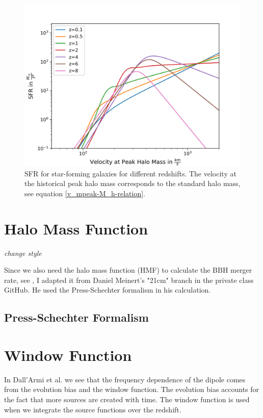 \begin{figure}[h]
    \centering
    \includegraphics[width=1\linewidth]{Images/sfr_of_v.png}
    \caption{SFR for star-forming galaxies for different redshifts. The velocity at the historical peak halo mass corresponds to the standard halo mass, see equation \ref{v_mpeak-M_h-relation}.}
    \label{SFR_of_v}
\end{figure} 

\section{Halo Mass Function}

\textit{change style}

Since we also need the halo mass function (HMF) to calculate the BBH merger rate, 
see \cite{van_son_redshift_2022}, I adapted it from Daniel Meinert's "21cm" branch in the private class GitHub. He used the Press-Schechter formalism in his calculation.

\subsection{Press-Schechter Formalism}
\section{Window Function}
\label{window_fct_section}

In Dall'Armi et al. \cite{dallarmi_dipole_2022} we see that the frequency dependence 
of the dipole comes from the evolution bias and the window function. The evolution 
bias accounts for the fact that more sources are created with time. The window 
function is used when we integrate the source functions over the redshift. 


